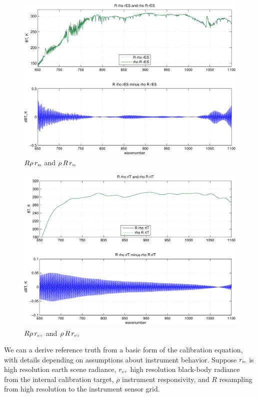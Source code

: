 \documentclass[12pt]{article}
\begin{document}
\begin{figure}
  \centering
  \includegraphics[height=8cm]{figures/ES_comm.pdf}
  \caption{$R\rho\,r_{\mbox{\tiny\textsc{es}}}$ and $\rho\,R\,r_{\mbox{\tiny\textsc{es}}}$}
  \label{ESdif}
\end{figure}

\begin{figure}
  \centering
  \includegraphics[height=8cm]{figures/BB_comm.pdf}
  \caption{$R\rho\,r_{\mbox{\tiny\textsc{ict}}}$ and $\rho\,R\,r_{\mbox{\tiny\textsc{ict}}}$}
  \label{BBdif}
\end{figure}

We can a derive reference truth from a basic form of the {\cris}
calibration equation, with details depending on assumptions about
instrument behavior.  Suppose $r_{\mbox{\tiny\textsc{es}}}$ is high resolution earth scene
radiance, $r_{\mbox{\tiny\textsc{ict}}}$ high resolution black-body radiance from the
internal calibration target, $\rho$ instrument responsivity, and $R$
resampling from high resolution to the instrument sensor grid.

\end{document}
